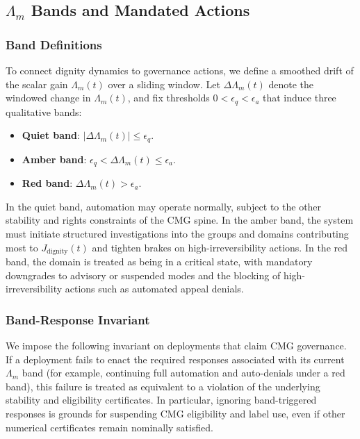 \documentclass[11pt]{article}
\begin{document}
\subsection{\texorpdfstring{$\Lambda_m$}{Lambda\_m} Bands and Mandated Actions}

\subsubsection{Band Definitions}

To connect dignity dynamics to governance actions, we define a smoothed drift of the scalar gain \(\Lambda_m(t)\) over a sliding window. Let \(\Delta \Lambda_m(t)\) denote the windowed change in \(\Lambda_m(t)\), and fix thresholds \(0 < \epsilon_q < \epsilon_a\) that induce three qualitative bands:
\begin{itemize}
  \item \textbf{Quiet band}: \(|\Delta \Lambda_m(t)| \leq \epsilon_q\).
  \item \textbf{Amber band}: \(\epsilon_q < \Delta \Lambda_m(t) \leq \epsilon_a\).
  \item \textbf{Red band}: \(\Delta \Lambda_m(t) > \epsilon_a\).
\end{itemize}
In the quiet band, automation may operate normally, subject to the other stability and rights constraints of the CMG spine. In the amber band, the system must initiate structured investigations into the groups and domains contributing most to \(J_{\mathrm{dignity}}(t)\) and tighten brakes on high-irreversibility actions. In the red band, the domain is treated as being in a critical state, with mandatory downgrades to advisory or suspended modes and the blocking of high-irreversibility actions such as automated appeal denials.

\subsubsection{Band-Response Invariant}

We impose the following invariant on deployments that claim CMG governance. If a deployment fails to enact the required responses associated with its current \(\Lambda_m\) band (for example, continuing full automation and auto-denials under a red band), this failure is treated as equivalent to a violation of the underlying stability and eligibility certificates. In particular, ignoring band-triggered responses is grounds for suspending CMG eligibility and label use, even if other numerical certificates remain nominally satisfied.
\end{document}

